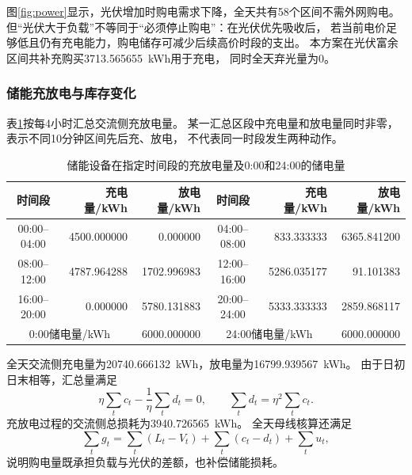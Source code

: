 \documentclass[UTF8,a4paper,12pt]{ctexart}
\newcommand{\ChargeTotal}{20740.666132}
\newcommand{\DischargeTotal}{16799.939567}
\newcommand{\LossTotal}{3940.726565}
\newcommand{\PVGridTopup}{3713.565655}
\begin{document}
图\ref{fig:power}显示，光伏增加时购电需求下降，全天共有58个区间不需外网购电。
但“光伏大于负载”不等同于“必须停止购电”：在光伏优先吸收后，
若当前电价足够低且仍有充电能力，购电储存可减少后续高价时段的支出。
本方案在光伏富余区间共补充购买\PVGridTopup\ kWh用于充电，
同时全天弃光量为0。

\subsubsection{储能充放电与库存变化}
表\ref{tab:storage}按每4小时汇总交流侧充放电量。
某一汇总区段中充电量和放电量同时非零，表示不同10分钟区间先后充、放电，
不代表同一时段发生两种动作。

\begin{table}[H]
  \centering\small
  \setlength{\tabcolsep}{4.5pt}
  \caption{储能设备在指定时间段的充放电量及0:00和24:00的储电量}\label{tab:storage}
  \begin{tabular}{|c|r|r|c|r|r|}
    \hline
    时间段 & 充电量/kWh & 放电量/kWh & 时间段 & 充电量/kWh & 放电量/kWh\\
    \hline
    00:00--04:00 & 4500.000000 & 0.000000 & 04:00--08:00 & 833.333333 & 6365.841200\\
    \hline
    08:00--12:00 & 4787.964288 & 1702.996983 & 12:00--16:00 & 5286.035177 & 91.101383\\
    \hline
    16:00--20:00 & 0.000000 & 5780.131883 & 20:00--24:00 & 5333.333333 & 2859.868117\\
    \hline
    \multicolumn{2}{|c|}{0:00储电量/kWh} & 6000.000000
    & \multicolumn{2}{c|}{24:00储电量/kWh} & 6000.000000\\
    \hline
  \end{tabular}
\end{table}

全天交流侧充电量为\ChargeTotal\ kWh，放电量为\DischargeTotal\ kWh。
由于日初日末相等，汇总量满足
\begin{equation}
  \eta\sum_t c_t-\frac{1}{\eta}\sum_t d_t=0,\qquad
  \sum_t d_t=\eta^2\sum_t c_t.
  \label{eq:totalstate}
\end{equation}
充放电过程的交流侧总损耗为\LossTotal\ kWh。
全天母线核算还满足
\begin{equation}
  \sum_tg_t=\sum_t(L_t-V_t)+\sum_t(c_t-d_t)+\sum_tu_t,
  \label{eq:totalbalance}
\end{equation}
说明购电量既承担负载与光伏的差额，也补偿储能损耗。
\end{document}
